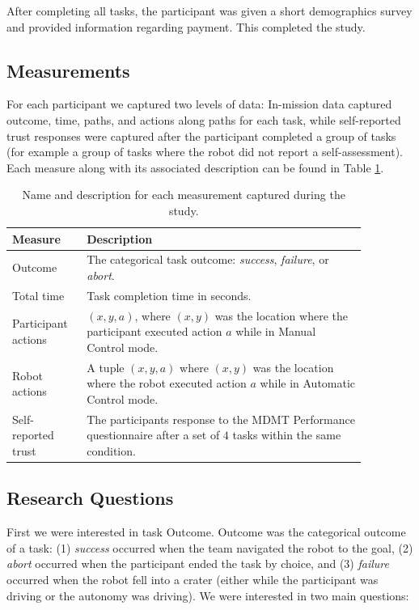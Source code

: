\documentclass[aaai]{article}
\begin{document}
After completing all tasks, the participant was given a short demographics survey and provided information regarding payment. This completed the study.

\subsection{Measurements}
For each participant we captured two levels of data: In-mission data captured outcome, time, paths, and actions along paths for each task, while self-reported trust responses were captured after the participant completed a group of tasks (for example a group of tasks where the robot did not report a self-assessment). Each measure along with its associated description can be found in Table \ref{measures_table}.

\begin{table}[h]
\begin{center}
\begin{tabular}{|p{0.17\linewidth}||p{0.70\linewidth}|}
\hline
\textbf{Measure} & \textbf{Description} \\
\hline
\hline
Outcome & The categorical task outcome: \emph{success}, \emph{failure}, or \emph{abort}.\\
\hline
Total time & Task completion time in seconds.\\
\hline
Participant actions &  $(x,y,a)$, where $(x, y)$ was the location where the participant executed action $a$ while in Manual Control mode.\\
\hline
Robot actions & A tuple $(x,y, a)$ where $(x, y)$ was the location where the robot executed action $a$ while in Automatic Control mode.\\
\hline
Self-reported trust &  The participants response to the MDMT Performance questionnaire after a set of $4$ tasks within the same condition.\\
\hline
\end{tabular}
\end{center}
\caption{Name and description for each measurement captured during the study.}
\label{measures_table}
\end{table}

\subsection{Research Questions}
First we were interested in task Outcome. Outcome was the categorical outcome of a task: (1) \emph{success} occurred when the team navigated the robot to the goal, (2) \emph{abort} occurred when the participant ended the task by choice, and (3) \emph{failure} occurred when the robot fell into a crater (either while the participant was driving or the autonomy was driving). We were interested in two main questions:
\end{document}

